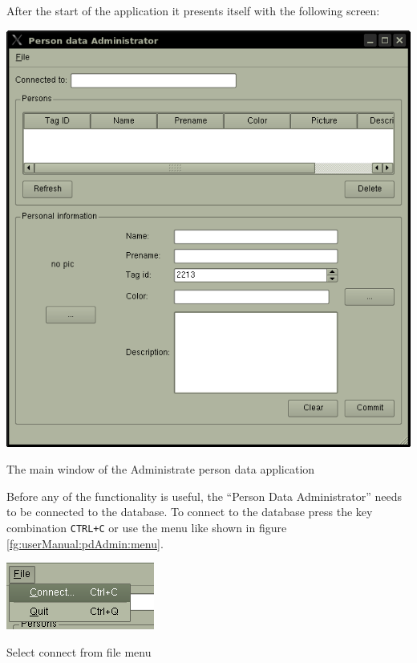   After the start of the application it presents itself with the following screen:
  \begin{staticFigure}
   \begin{center}
     \includegraphics[scale=0.5]{images/UserManual/pdAdmin/main.png}
     \caption{The main window of the Administrate person data application}
     \label{fg:userManual:pdAdmin:mainWindow}
   \end{center}
  \end{staticFigure}

  Before any of the functionality is useful, the ``Person Data Administrator'' needs to be connected to the database. To connect to the database press the key combination \texttt{CTRL+C} or use the menu like shown in figure \ref{fg:userManual:pdAdmin:menu}.
  \begin{staticFigure}
   \begin{center}
     \includegraphics{images/UserManual/pdAdmin/menu.png}
     \caption{Select connect from file menu}
     \label{fg:userManual:pdAdmin:menu}
   \end{center}
  \end{staticFigure}

